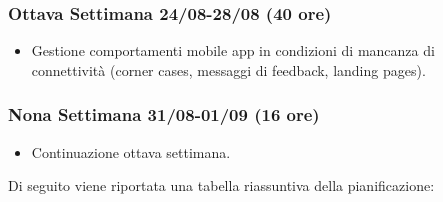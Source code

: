 \begin{trivlist}
\item \subsubsection{Ottava Settimana 24/08-28/08 (40 ore)}
\begin{itemize}
	\item Gestione comportamenti mobile app in condizioni di mancanza di connettività (corner cases, messaggi di feedback, landing pages).
\end{itemize}

\item \subsubsection{Nona Settimana 31/08-01/09 (16 ore)}
\begin{itemize}
	\item Continuazione ottava settimana.
\end{itemize}
\end{trivlist}\clearpage
Di seguito viene riportata una tabella riassuntiva della pianificazione:


